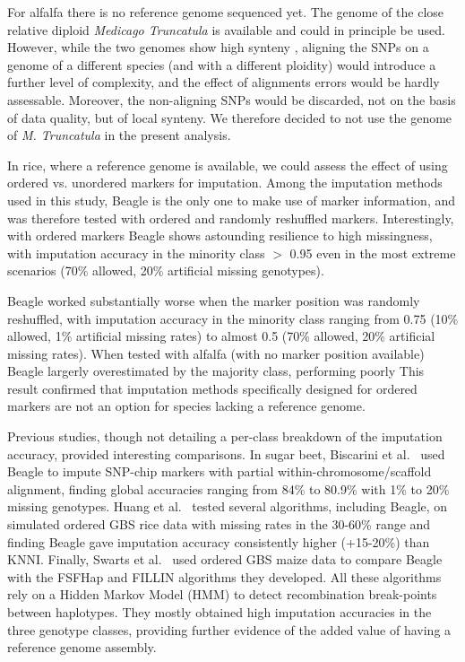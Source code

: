 For alfalfa there is no reference genome sequenced yet. The genome of the close relative diploid \emph{Medicago Truncatula} is available \cite{young_medicago_2011} and could in principle be used. However, while the two genomes show high synteny \cite{li_saturated_2014}, aligning the SNPs on a genome of a different species (and with a different ploidity) would introduce a further level of complexity, and the effect of alignments errors would be hardly assessable. Moreover, the non-aligning SNPs would be discarded, not on the basis of data quality, but of local synteny. We therefore decided to not use the genome of \emph{M. Truncatula} in the present analysis.

In rice, where a reference genome is available, we could assess the effect of using ordered vs. unordered markers for imputation. Among the imputation methods used in this study, Beagle is the only one to make use of marker information, and was therefore tested with ordered and randomly reshuffled markers. Interestingly, with ordered markers Beagle shows astounding resilience to high missingness, with imputation accuracy in the minority class $>$ 0.95 even in the most extreme scenarios (70\% allowed, 20\% artificial missing genotypes).

Beagle worked substantially worse when the marker position was randomly reshuffled, with imputation accuracy in the minority class ranging from 0.75 (10\% allowed, 1\% artificial missing rates) to almost 0.5 (70\% allowed, 20\% artificial missing rates). When tested with alfalfa (with no marker position available) Beagle largerly overestimated by the majority class, performing poorly
This result confirmed that imputation methods specifically designed for ordered markers are not an option for species lacking a reference genome.

Previous studies, though not detailing a per-class breakdown of the imputation accuracy, provided interesting comparisons. In sugar beet, Biscarini et al.~\cite{biscarini_genome-enabled_2014} used Beagle to impute SNP-chip markers with partial within-chromosome/scaffold alignment, finding global accuracies ranging from 84\% to 80.9\% with 1\% to 20\% missing genotypes. Huang et al.~\cite{huang_efficient_2014} tested several algorithms, including Beagle, on simulated ordered GBS rice data with missing rates in the 30-60\% range and finding Beagle gave imputation accuracy consistently higher (+15-20\%) than KNNI. 
Finally, Swarts et al.~\cite{swarts_novel_2014} used ordered GBS maize data to compare Beagle with the FSFHap and FILLIN algorithms they developed. All these algorithms rely on a Hidden Markov Model (HMM) to detect recombination break-points between haplotypes. They mostly obtained high imputation accuracies in the three genotype classes, providing further evidence of the added value of having a reference genome assembly.

